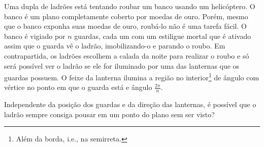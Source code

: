 Uma dupla de ladrões está tentando roubar um banco usando um helicóptero. O banco é um plano completamente coberto por moedas de ouro. Porém, mesmo que o banco exponha suas moedas de ouro, roubá-lo não é uma tarefa fácil. O banco é vigiado por $n$ guardas, cada um com um estiligue mortal que é ativado assim que o guarda vê o ladrão, imobilizando-o e parando o roubo. Em contrapartida, os ladrões escolhem a calada da noite para realizar o roubo e só será possível ver o ladrão se ele for iluminado por uma das lanternas que os guardas possuem. O feixe da lanterna ilumina a região no interior\footnote{Além da borda, i.e., na semirreta.} de ângulo com vértice no ponto em que o guarda está e ângulo $\frac{2\pi}{n}$.

Independente da posição dos guardas e da direção das lanternas, é possível que o ladrão sempre consiga pousar em um ponto do plano sem ser visto?

